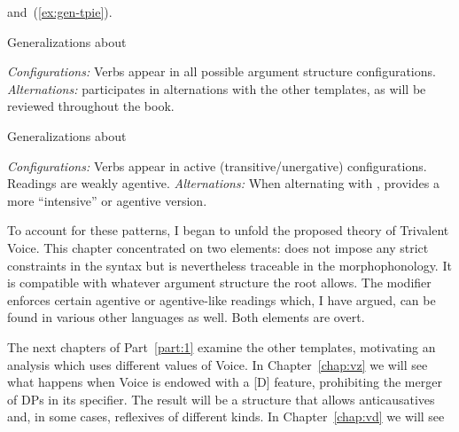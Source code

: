 \begin{exe}
\begin{xlist}
\begin{exe}
\begin{xlist}
\begin{exe}
\begin{xlist}
\begin{exe}
\begin{exe}
\begin{xlist}
\begin{exe}
\begin{xlist}
\begin{exe}
\begin{xlist}
\begin{exe}
\begin{xlist}
\begin{exe}
\begin{xlist}
\begin{exe}
\begin{xlist}
\begin{exe}
\begin{xlist}
\begin{exe}
\begin{xlist}
\begin{xlist}
\begin{exe}
\begin{xlist}
\begin{exe}
\begin{xlist}
\begin{exe}
\begin{xlist}
\begin{exe}
\begin{xlist}
\begin{exe}
\begin{xlist}
\begin{exe}
\begin{xlist}
\begin{exe}
\begin{xlist}
\begin{exe}
\begin{xlist}
\begin{exe}
\begin{xlist}
\begin{exe}
\begin{xlist}
\begin{exe}
\begin{xlist}
\begin{exe}
\begin{xlist}
\begin{xlist}
\begin{xlist}
\begin{exe}
\begin{xlist}
\begin{xlist}
\begin{xlist}
\begin{exe}
\begin{exe}
\begin{xlist}
\begin{exe}
\begin{xlist}
\begin{exe}
\begin{xlist}
\begin{exe}
\begin{xlist}
\begin{exe}
\begin{xlist}
\begin{exe}
\begin{xlist}
\begin{exe}
\begin{xlist}
\begin{exe}
\begin{exe}
\begin{xlist}
\begin{xlist}
\begin{exe}
\begin{xlist}
\begin{exe}
\begin{xlist}
\begin{exe}
\begin{xlist}
\begin{exe}
\begin{xlist}
\begin{exe}
\begin{xlist}
\begin{exe}
\begin{xlist}
\begin{exe}
\begin{exe}
\begin{exe}
\begin{xlist}
\begin{exe}
\begin{xlist}
\begin{exe}
\begin{xlist}
\begin{exe}
\begin{xlist}
\begin{exe}
\begin{xlist}
\begin{exe}
\begin{xlist}
\begin{exe}
\begin{xlist}
\begin{exe}
\begin{xlist}
and~(\ref{ex:gen-tpie}).\largerpage

 \begin{exe}
 \ex  \label{ex:gen-tkal2}Generalizations about {\tkal}
 \begin{xlist} 
 	\ex  \textit{Configurations:} Verbs appear in all possible argument structure configurations. 
 	\ex  \textit{Alternations:} {\tkal} participates in alternations with the other templates, as will be reviewed throughout the book. 
 \z

 \ex  \label{ex:gen-tpie2}Generalizations about {\tpie}
 \begin{xlist} 
 	\ex \textit{Configurations:} Verbs appear in active (transitive/unergative) configurations. 
		Readings are weakly agentive.
 	\ex  \textit{Alternations:} When alternating with {\tkal}, {\tpie} provides a more ``intensive'' or agentive version. 
 \z
\z 

To account for these patterns, I began to unfold the proposed theory of Trivalent Voice. This chapter concentrated on two elements:  does not impose any strict constraints in the syntax but is nevertheless traceable in the morphophonology. It is compatible with whatever argument structure the root allows. The modifier {\va} enforces certain agentive or agentive-like readings which, I have argued, can be found in various other languages as well. Both elements are overt.

The next chapters of Part~\ref{part:1} examine the other templates, motivating an analysis which uses different values of Voice. In Chapter~\ref{chap:vz} we will see what happens when Voice is endowed with a [\textminus{}D] feature, prohibiting the merger of DPs in its specifier. The result will be a structure that allows anticausatives and, in some cases, reflexives of different kinds. In Chapter~\ref{chap:vd} we will see 
\end{xlist}
\end{xlist}
\end{exe}
\end{xlist}
\end{exe}
\end{xlist}
\end{exe}
\end{xlist}
\end{exe}
\end{xlist}
\end{exe}
\end{xlist}
\end{exe}
\end{xlist}
\end{exe}
\end{xlist}
\end{exe}
\end{xlist}
\end{exe}
\end{exe}
\end{exe}
\end{xlist}
\end{exe}
\end{xlist}
\end{exe}
\end{xlist}
\end{exe}
\end{xlist}
\end{exe}
\end{xlist}
\end{exe}
\end{xlist}
\end{exe}
\end{xlist}
\end{xlist}
\end{exe}
\end{exe}
\end{xlist}
\end{exe}
\end{xlist}
\end{exe}
\end{xlist}
\end{exe}
\end{xlist}
\end{exe}
\end{xlist}
\end{exe}
\end{xlist}
\end{exe}
\end{xlist}
\end{exe}
\end{exe}
\end{xlist}
\end{xlist}
\end{xlist}
\end{exe}
\end{xlist}
\end{xlist}
\end{xlist}
\end{exe}
\end{xlist}
\end{exe}
\end{xlist}
\end{exe}
\end{xlist}
\end{exe}
\end{xlist}
\end{exe}
\end{xlist}
\end{exe}
\end{xlist}
\end{exe}
\end{xlist}
\end{exe}
\end{xlist}
\end{exe}
\end{xlist}
\end{exe}
\end{xlist}
\end{exe}
\end{xlist}
\end{exe}
\end{xlist}
\end{xlist}
\end{exe}
\end{xlist}
\end{exe}
\end{xlist}
\end{exe}
\end{xlist}
\end{exe}
\end{xlist}
\end{exe}
\end{xlist}
\end{exe}
\end{xlist}
\end{exe}
\end{xlist}
\end{exe}
\end{exe}
\end{xlist}
\end{exe}
\end{xlist}
\end{exe}
\end{xlist}
\end{exe}
